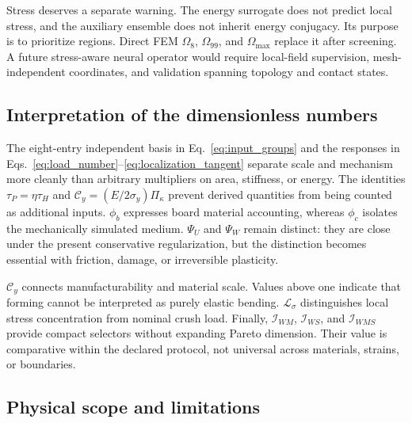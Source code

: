\documentclass[11pt]{article}
\newcommand{\phib}{\phi_{b}}
\newcommand{\phic}{\phi_{c}}
\newcommand{\PsiU}{\Psi_{U}}
\newcommand{\PsiW}{\Psi_{W}}
\newcommand{\Om}{\Omega_{8}}
\newcommand{\Ommax}{\Omega_{\max}}
\newcommand{\Iws}{\mathcal I_{WMS}}
\begin{document}
Stress deserves a separate warning. The energy surrogate does not predict local stress, and the auxiliary ensemble does not inherit energy conjugacy. Its purpose is to prioritize regions. Direct FEM $\Om$, $\Omega_{99}$, and $\Ommax$ replace it after screening. A future stress-aware neural operator would require local-field supervision, mesh-independent coordinates, and validation spanning topology and contact states.

\subsection{Interpretation of the dimensionless numbers}

The eight-entry independent basis in Eq.~\eqref{eq:input_groups} and the responses in Eqs.~\eqref{eq:load_number}--\eqref{eq:localization_tangent} separate scale and mechanism more cleanly than arbitrary multipliers on area, stiffness, or energy. The identities $\tau_P=\eta\tau_H$ and $\mathcal C_y=(E/2\sigma_y)\Pi_\kappa$ prevent derived quantities from being counted as additional inputs. $\phib$ expresses board material accounting, whereas $\phic$ isolates the mechanically simulated medium. $\PsiU$ and $\PsiW$ remain distinct: they are close under the present conservative regularization, but the distinction becomes essential with friction, damage, or irreversible plasticity.

$\mathcal C_y$ connects manufacturability and material scale. Values above one indicate that forming cannot be interpreted as purely elastic bending. $\mathcal L_\sigma$ distinguishes local stress concentration from nominal crush load. Finally, $\mathcal I_{WM}$, $\mathcal I_{WS}$, and $\Iws$ provide compact selectors without expanding Pareto dimension. Their value is comparative within the declared protocol, not universal across materials, strains, or boundaries.

\subsection{Physical scope and limitations}
\end{document}
